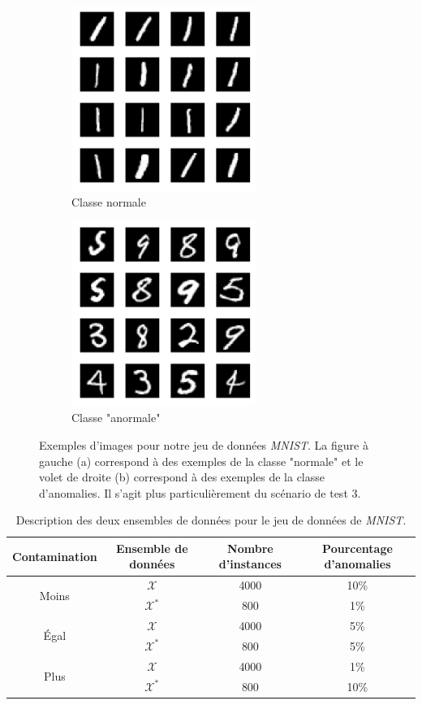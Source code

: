 \begin{figure}[htb]
	\centering
	\begin{subfigure}{6cm}
		\centering\includegraphics[width=6cm]{images/mnist-inliers}
		\caption{Classe normale}
	\end{subfigure}
	\begin{subfigure}{6cm}
		\centering\includegraphics[width=6cm]{images/mnist-outliers}
		\caption{Classe "anormale"}
	\end{subfigure}
	\DIFdelbeginFL %
\DIFdelendFL \DIFaddbeginFL \caption[Exemples d'images pour notre jeu de données \textit{MNIST}.]{\DIFaddendFL Exemples d'images pour notre jeu de données \textit{MNIST}. La figure à gauche (a) correspond à des exemples de la classe "normale" et le volet de droite (b) correspond à des exemples de la classe d'anomalies. Il s'agit plus particulièrement du scénario de test 3.}
	\label{fig:mnist}
\end{figure}

\begin{table}[h]
	\centering
	\caption{Description des deux ensembles de données pour le jeu de données de \textit{MNIST}.}
	\begin{tabular}{| c | c | c | c |}
		\hline
		\rowcolor{Gray}
		Contamination & Ensemble de données  & Nombre d'instances & Pourcentage d'anomalies  \\
		\hline
		\multirow{2}{*}{Moins} 
		& $\mathcal{X}$ & 4000 & 10\%  \\
		& $\mathcal{X^*}$  & 800 & 1\%  \\ 
		\midrule
		\multirow{2}{*}{Égal} 
		& $\mathcal{X}$ & 4000 & 5\%  \\
		& $\mathcal{X^*}$  & 800 & 5\%  \\ 
		\midrule
		\multirow{2}{*}{Plus} 
		& $\mathcal{X}$ & 4000 & 1\%  \\
		& $\mathcal{X^*}$  & 800 & 10\%  \\ 
		\midrule
	\end{tabular}
	\label{tab:dataset2}
\end{table}

